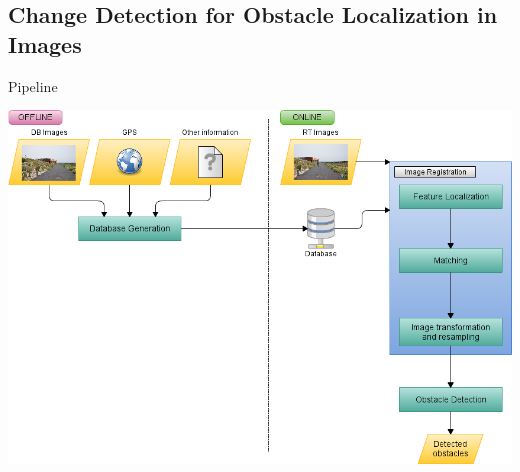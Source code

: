 \graphicspath{
  {./images/bmps/}{./images/vects/}{./images/}
  {./images/presentation/bmps/}{./images/presentation/vects/}{./images/presentation/}
  {./images/chapter00/bmps/}{./images/chapter00/vects/}{./images/chapter00/}
  {./images/chapter01/bmps/}{./images/chapter01/vects/}{./images/chapter01/}
}

\subsection{Change Detection for Obstacle Localization in Images}
\begin{frame}[plain]{Pipeline}
  \begin{center}
    \includegraphics[height=1.0\textheight]{pipeline_cp01}
  \end{center}
  
  \note {
  }
\end{frame}


